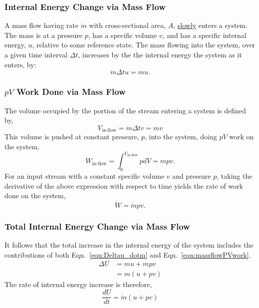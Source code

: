 \subsubsection{Internal Energy Change via Mass Flow}
A mass flow having rate $\dot{m}$ with cross-sectional area, $A$, \underline{slowly} enters a system. The mass is at a pressure $p$, has a specific volume $v$, and has a specific internal energy, $u$, relative to some reference state.
The mass flowing into the system, over a given time interval $\Delta t$, increases by the the internal energy the system as it enters, by:
\begin{equation}
\label{eqn:Deltau_dotm}
\dot{m}\Delta t u=mu.
\end{equation}

\subsubsection{$pV$ Work Done via Mass Flow}\label{sec:pvwork}
The volume occupied by the portion of the stream entering a system is defined by,
\begin{equation}
V_{\text{in-flow}}=\dot{m}\Delta t v=mv
\end{equation}
This volume is pushed at constant pressure, $p$, into the system, doing $pV$ work on the system,
\begin{equation}
\label{eqn:massflowPVwork}
W_{\text{in-flow}}=\int_{0}^{V_{\text{in-flow}}}p dV=mpv.
\end{equation}
For an input stream with a constant specific volume $v$ and pressure $p$, taking the derivative of the above expression with respect to time yields the rate of work  done on the system,
\begin{equation}
    \dot{W}=\dot{m}pv.
\end{equation}

\subsubsection{Total Internal Energy Change via Mass Flow}
It follows that the total increase in the internal energy of the system includes the contributions of both Eqn.~\ref{eqn:Deltau_dotm} and  Eqn.~\ref{eqn:massflowPVwork}.
\begin{equation}
\begin{split}
\Delta U&=mu+mpv\\
&=m(u+pv)
\end{split}
\end{equation}
The rate of internal energy increase is therefore,
\begin{equation}
\label{eqn:rateofDeltaU}
\frac{d U}{dt}=\dot{m}(u+pv)
\end{equation}
